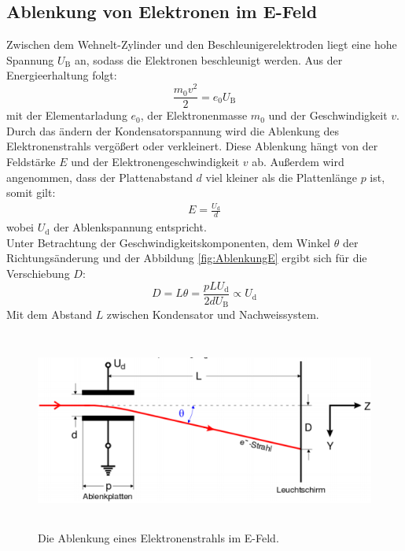 \subsection{Ablenkung von Elektronen im E-Feld}
Zwischen dem Wehnelt-Zylinder und den Beschleunigerelektroden liegt eine hohe Spannung $U_\text{B}$ an, sodass die Elektronen beschleunigt werden. Aus der Energieerhaltung folgt:
\begin{equation}
	\frac{m_0 v^2}{2} = e_0 U_\text{B}
\end{equation}
mit der Elementarladung $e_0$, der Elektronenmasse $m_0$ und der Geschwindigkeit $v$. \\
Durch das ändern der Kondensatorspannung wird die Ablenkung des Elektronenstrahls vergößert oder verkleinert. Diese Ablenkung hängt von der Feldstärke $E$ und der Elektronengeschwindigkeit $v$ ab. Außerdem wird angenommen, dass der Plattenabstand $d$ viel kleiner als die Plattenlänge $p$ ist, somit gilt:
\begin{align*}
	E = \frac{U_\text{d}}{d}
\end{align*}
wobei $U_\text{d}$ der Ablenkspannung entspricht. \\
Unter Betrachtung der Geschwindigkeitskomponenten, dem Winkel $\theta$ der Richtungsänderung und der Abbildung \eqref{fig:AblenkungE} ergibt sich für die Verschiebung $D$:
\begin{equation}
	D = L\theta = \frac{p L U_\text{d}}{2 d U_\text{B}} \propto U_\text{d}
	\label{eqn:DUd}
\end{equation}
Mit dem Abstand $L$ zwischen Kondensator und Nachweissystem. \\

\begin{figure}[H]
	\centering
	\includegraphics[height=6.5cm]{picture/AblenkungEFeld}
	\caption{Die Ablenkung eines Elektronenstrahls im E-Feld. \cite[3]{V501}}
	\label{fig:AblenkungE}
\end{figure}

